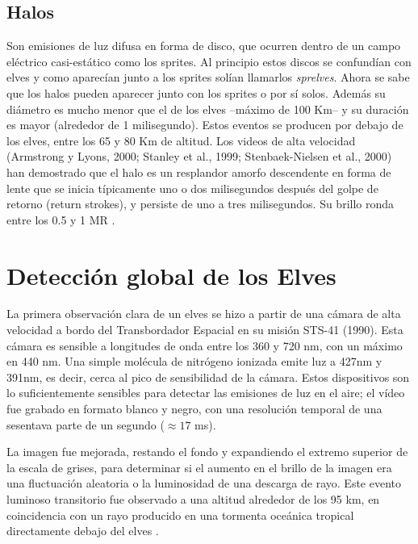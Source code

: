 \documentclass[12pt,oneside,openany,letter]{book}
\begin{document}
\section{Halos}
Son emisiones de luz difusa en forma de disco, que ocurren dentro de un campo eléctrico casi-estático como los sprites. Al principio estos discos se confundían con elves y como aparecían junto a los sprites solían llamarlos \textit{sprelves}. Ahora se sabe que los halos pueden aparecer junto con los sprites o por sí solos. Además su diámetro es mucho menor que el de los elves --máximo de 100 Km-- y su duración es mayor (alrededor de 1 milisegundo). Estos eventos se producen por debajo de los elves, entre los 65 y 80 Km de altitud. Los videos de alta velocidad (Armstrong y Lyons, 2000; Stanley et al., 1999; Stenbaek-Nielsen et al., 2000) han demostrado que el halo es un resplandor amorfo descendente en forma de lente que se inicia típicamente uno o dos milisegundos después del golpe de retorno (return strokes), y persiste de uno a tres milisegundos. Su brillo ronda entre los 0.5 y 1 MR \cite{FullekrugEtal2006}.


\chapter{Detección global de los Elves}\label{deteccion}
La primera observación clara de un elves se hizo a partir de una cámara de alta velocidad a bordo del Transbordador Espacial en su misión STS-41 (1990). Esta cámara es sensible a longitudes de onda entre los 360 y 720 nm, con un máximo en 440 nm. Una simple molécula de nitrógeno ionizada emite luz a 427nm y 391nm, es decir, cerca al pico de sensibilidad de la cámara. Estos dispositivos son lo suficientemente sensibles para detectar las emisiones de luz en el aire; el vídeo fue grabado en formato blanco y negro, con una resolución temporal de una sesentava parte de un segundo ($\approx 17$ ms). 


La imagen fue mejorada, restando el fondo y expandiendo el extremo superior de la escala de grises, para determinar si el aumento en el brillo de la imagen era una fluctuación aleatoria o la luminosidad de una descarga de rayo. Este evento luminoso transitorio fue observado a una altitud alrededor de los 95 km, en coincidencia con un rayo producido en una tormenta oceánica tropical directamente debajo del elves \cite{BoeckEtal1992}.  
\end{document}
